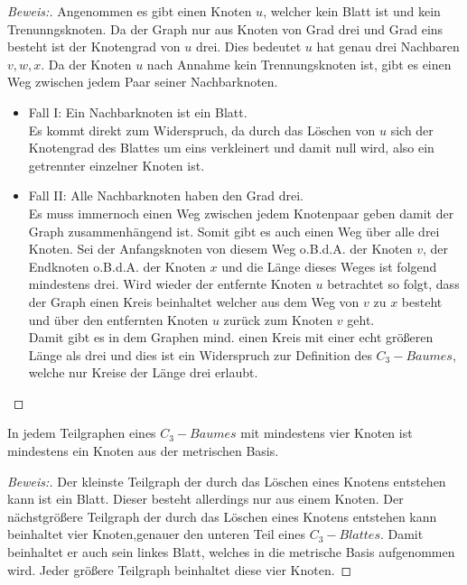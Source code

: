 \begin{proof}[Beweis:]
Angenommen es gibt einen Knoten $u$, welcher kein Blatt ist und kein Trenunngsknoten. Da der Graph nur aus Knoten von Grad drei und Grad eins besteht ist der Knotengrad von $u$ drei. Dies bedeutet $u$ hat genau drei Nachbaren $v,w,x$. Da
der Knoten $u$ nach Annahme kein Trennungsknoten ist, gibt es einen Weg zwischen jedem Paar seiner Nachbarknoten.
\begin{itemize}
\item Fall I: Ein Nachbarknoten ist ein Blatt.\\ Es kommt direkt zum Widerspruch, da durch das Löschen von $u$ sich der Knotengrad des Blattes um eins verkleinert und damit null wird, also ein getrennter einzelner Knoten ist.
\item Fall II: Alle Nachbarknoten haben den Grad drei.\\
Es muss immernoch einen Weg zwischen jedem Knotenpaar geben damit der Graph zusammenhängend ist. Somit gibt es auch einen Weg über alle drei Knoten. Sei der Anfangsknoten von diesem Weg o.B.d.A. der Knoten $v$, der Endknoten o.B.d.A. der Knoten $x$ und die Länge dieses Weges ist folgend mindestens drei. Wird wieder der entfernte Knoten $u$ betrachtet so folgt, dass der Graph einen Kreis beinhaltet welcher aus dem Weg von $v$ zu $x$ besteht und über den entfernten Knoten $u$ zurück zum Knoten $v$ geht.\\
Damit gibt es in dem Graphen mind. einen Kreis mit einer echt größeren Länge als drei und dies ist ein Widerspruch zur Definition des $C_{3}-Baumes$, welche nur Kreise der Länge drei erlaubt.
\end{itemize}
\end{proof}
\begin{lem}
\label{bkb2}
In jedem Teilgraphen eines $C_{3}-Baumes$ mit mindestens vier Knoten ist mindestens ein Knoten aus der metrischen Basis.
\end{lem}
\begin{proof}[Beweis:]
Der kleinste Teilgraph der durch das Löschen eines Knotens entstehen kann ist ein Blatt. Dieser besteht allerdings nur aus einem Knoten. Der nächstgrößere Teilgraph der durch das Löschen eines Knotens entstehen kann beinhaltet vier Knoten,genauer den unteren Teil eines $C_{3}-Blattes$. Damit beinhaltet er auch sein linkes Blatt, welches in die metrische Basis aufgenommen wird. Jeder größere Teilgraph beinhaltet diese vier Knoten. %
\end{proof}
